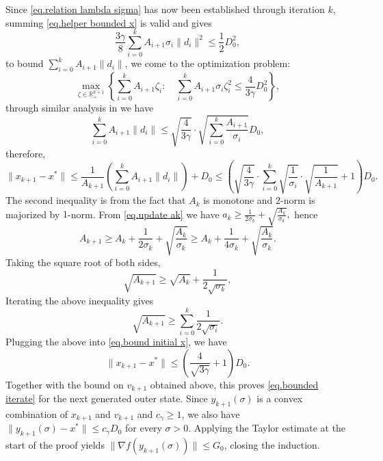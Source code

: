 \documentclass[moor,sglanonrev]{informs4}
\begin{document}
\begin{APPENDICES}
    Since \eqref{eq.relation lambda sigma} has now been established through iteration $k$, summing \eqref{eq.helper bounded x} is valid and gives
    \begin{equation*}
        \frac{3\gamma}{8}\sum_{i=0}^k A_{i+1}\sigma_i \|d_i\|^2 \leq \frac{1}{2}D_0^2,
    \end{equation*}
    to bound $\sum_{i=0}^k A_{i+1}\|d_i\|$, we come to the optimization problem:
    \begin{equation*}
        \max _{\zeta \in \mathbb{R}^{k+1}_+}\left\{\sum_{i=0}^{k} A_{i+1}\zeta_i: \quad \sum_{i=0}^{k} A_{i+1} \sigma_i\zeta_i^2 \leq \frac{4}{3\gamma}D_0^2\right\},
    \end{equation*}
    through similar analysis in \citet[Lemma A.2]{monteiro2013accelerated} we have
    \begin{equation*}
        \sum_{i=0}^k A_{i+1}\|d_i\| \leq \sqrt{\frac{4}{3\gamma}}\cdot \sqrt{\sum_{i=0}^k \frac{A_{i+1}}{\sigma_i}} D_0,
    \end{equation*}
    therefore,
    \begin{equation}\label{eq.bound initial x}
        \|x_{k+1}-x^*\|  \leq \frac{1}{A_{k+1}}\left (\sum_{i=0}^k A_{i+1}\|d_i\|\right)+D_0  \leq \left(\sqrt{\frac{4}{3\gamma}}\cdot \sum_{i=0}^k\sqrt{\frac{1}{\sigma_i}}\cdot \sqrt{\frac{1}{A_{k+1}}} +1\right)D_0.
    \end{equation}
    The second inequality is from the fact that $A_k$ is monotone and $2$-norm is majorized by $1$-norm. From \eqref{eq.update ak} we have
    \(
    a_k \geq \frac{1}{2\sigma_k}+\sqrt{\frac{A_k}{\sigma_k}},
    \)
    hence
    \begin{equation*}
        A_{k+1}\geq A_k+\frac{1}{2\sigma_k}+\sqrt{\frac{A_k}{\sigma_k}}\geq A_k+\frac{1}{4\sigma_k}+\sqrt{\frac{A_k}{\sigma_k}}.
    \end{equation*}
    Taking the square root of both sides,
    \begin{equation*}
        \sqrt{A_{k+1}}\geq \sqrt{A_k}+\frac{1}{2\sqrt{\sigma_k}},
    \end{equation*}
    Iterating the above inequality gives
    \begin{equation*}
        \sqrt{A_{k+1}}\geq \sum_{i=0}^k \frac{1}{2\sqrt{\sigma_i}}.
    \end{equation*}
    Plugging the above into \eqref{eq.bound initial x}, we have
    \begin{equation*}
        \|x_{k+1}-x^*\| \leq \left( \frac{4}{\sqrt{3\gamma}}+1\right) D_0.
    \end{equation*}
    Together with the bound on $v_{k+1}$ obtained above, this proves \eqref{eq.bounded iterate} for the next generated outer state. Since $y_{k+1}(\sigma)$ is a convex combination of $x_{k+1}$ and $v_{k+1}$ and $c_\gamma\geq1$, we also have
    \(
        \|y_{k+1}(\sigma)-x^*\|\leq c_\gamma D_0
    \)
    for every $\sigma>0$. Applying the Taylor estimate at the start of the proof yields $\|\nabla f(y_{k+1}(\sigma))\|\leq G_0$, closing the induction.
    \Halmos \endproof
\end{APPENDICES}
\end{document}
